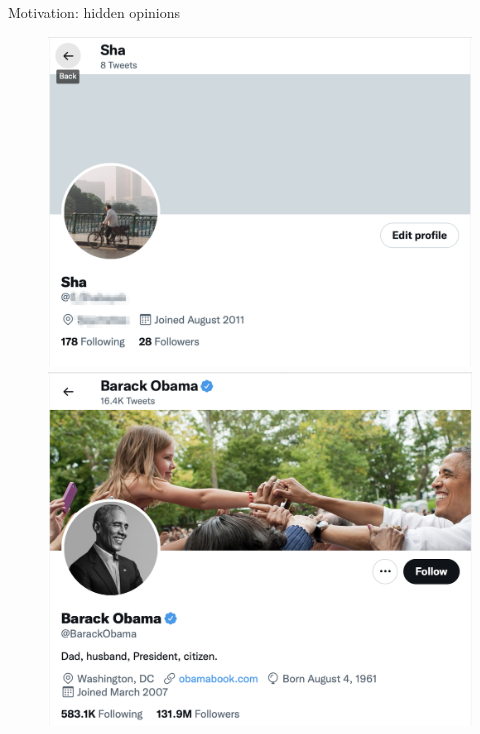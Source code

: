 \documentclass[xcolor=table,handout]{beamer}
\begin{document}
\begin{frame}{Motivation: hidden opinions}
\begin{figure}
\hspace{-2cm}
\begin{minipage}{.5\textwidth}
  \centering
  \includegraphics[scale = 0.25]{./img/obama_tw.png}
\end{minipage}%
 \begin{minipage}{.4\textwidth}
  \centering
  \includegraphics[scale = 0.3]{./img/shaden_tw.png}
\end{minipage}
\end{figure}
\end{frame}
\end{document}
